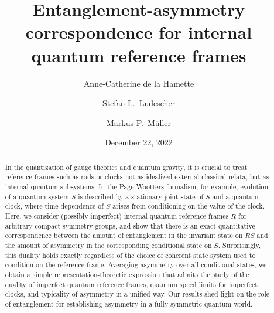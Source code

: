 \documentclass[aps,10pt,twocolumn,showpacs,pra,citeautoscript,amsmath,amssymb,floatfix,superscriptaddress]{revtex4-1}
\begin{document}
\title{Entanglement-asymmetry correspondence for internal quantum reference frames}

\author{Anne-Catherine de la Hamette}
\author{Stefan L.\ Ludescher}
\author{Markus P.\ M\"uller}

\date{December 22, 2022}

\begin{abstract}
In the quantization of gauge theories and quantum gravity, it is crucial to treat reference frames such as rods or clocks not as idealized external classical relata, but as internal quantum subsystems. In the Page-Wootters formalism, for example, evolution of a quantum system $S$ is described by a stationary joint state of $S$ and a quantum clock, where time-dependence of $S$ arises from conditioning on the value of the clock. Here, we consider (possibly imperfect) internal quantum reference frames $R$ for arbitrary compact symmetry groups, and show that there is an exact quantitative correspondence between the amount of entanglement in the invariant state on $RS$ and the amount of asymmetry in the corresponding conditional state on $S$. Surprisingly, this duality holds exactly regardless of the choice of coherent state system used to condition on the reference frame. Averaging asymmetry over all conditional states, we obtain a simple representation-theoretic expression that admits the study of the quality of imperfect quantum reference frames, quantum speed limits for imperfect clocks, and typicality of asymmetry in a unified way. Our results shed light on the role of entanglement for establishing asymmetry in a fully symmetric quantum world.
\end{abstract}
\end{document}
